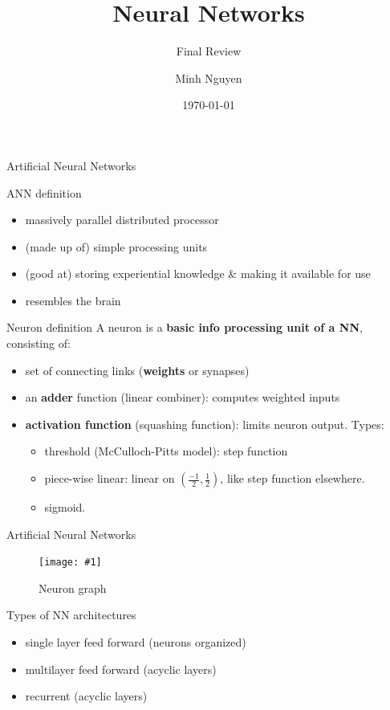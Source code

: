 \documentclass[9pt,t]{beamer}
\title{Neural Networks}
\subtitle{Final Review}
\date{\today}
\author{Minh Nguyen}
\newcommand{\picHereWidth}[4] { %
    \begin{figure}[htp] %
        \centering
        \texttt{[image: \#1]} %
        \caption{#2} %
        \label{#3}
    \end{figure} %
}
\begin{document}
\maketitle

\begin{frame}{Artificial Neural Networks}
    \begin{alertblock}{ANN definition}
        \begin{itemize}
            \item massively parallel distributed processor
            \item (made up of) simple processing units
            \item (good at) storing experiential knowledge \& making it available for use
            \item resembles the brain
        \end{itemize}
    \end{alertblock}
    \begin{alertblock}{Neuron definition}
        A neuron is a \textbf{basic info processing unit of a NN}, consisting of:
        \begin{itemize}
            \item set of connecting links (\textbf{weights} or synapses)
            \item an \textbf{adder} function (linear combiner): computes weighted inputs
            \item \textbf{activation function} (squashing function): limits neuron output. Types:
            \begin{itemize}
                \item threshold (McCulloch-Pitts model): step function
                \item piece-wise linear: linear on $(\frac{-1}{2}, \frac{1}{2})$, like step function elsewhere.
                \item sigmoid.
            \end{itemize}
        \end{itemize}
    \end{alertblock}
\end{frame}

\begin{frame}{Artificial Neural Networks}
    \picHereWidth{neuron_graph}{Neuron graph}{fig:neuron}{0.7\linewidth}
    \begin{alertblock}{Types of NN architectures}
        \begin{itemize}
            \item single layer feed forward (neurons organized)
            \item multilayer feed forward (acyclic layers)
            \item recurrent (acyclic layers)
        \end{itemize}
    \end{alertblock}
\end{frame}
\end{document}
